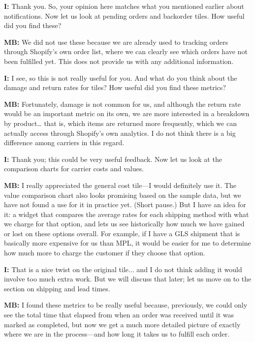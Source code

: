 \documentclass{imc-inf}
\begin{document}
\begin{appendices}
  \noindent\textbf{I:} Thank you. So, your opinion here matches what you mentioned earlier about notifications. Now let us look at pending orders and backorder tiles. How useful did you find these?

  \noindent\textbf{MB:} We did not use these because we are already used to tracking orders through Shopify's own order list, where we can clearly see which orders have not been fulfilled yet. This does not provide us with any additional information.

  \noindent\textbf{I:} I see, so this is not really useful for you. And what do you think about the damage and return rates for tiles? How useful did you find these metrics?

  \noindent\textbf{MB:} Fortunately, damage is not common for us, and although the return rate would be an important metric on its own, we are more interested in a breakdown by product… that is, which items are returned more frequently, which we can actually access through Shopify's own analytics. I do not think there is a big difference among carriers in this regard.

  \noindent\textbf{I:} Thank you; this could be very useful feedback. Now let us look at the comparison charts for carrier costs and values.

  \noindent\textbf{MB:} I really appreciated the general cost tile—I would definitely use it. The value comparison chart also looks promising based on the sample data, but we have not found a use for it in practice yet. (Short pause.) But I have an idea for it: a widget that compares the average rates for each shipping method with what we charge for that option, and lets us see historically how much we have gained or lost on these options overall. For example, if I have a GLS shipment that is basically more expensive for us than MPL, it would be easier for me to determine how much more to charge the customer if they choose that option.

  \noindent\textbf{I:} That is a nice twist on the original tile... and I do not think adding it would involve too much extra work. But we will discuss that later; let us move on to the section on shipping and lead times.

  \noindent\textbf{MB:} I found these metrics to be really useful because, previously, we could only see the total time that elapsed from when an order was received until it was marked as completed, but now we get a much more detailed picture of exactly where we are in the process—and how long it takes us to fulfill each order.


\end{appendices}
\end{document}
